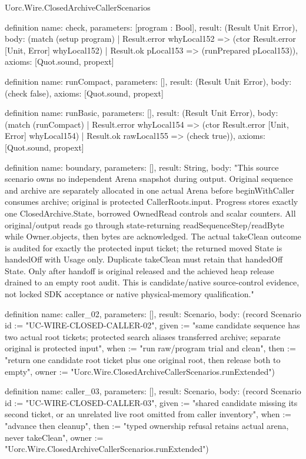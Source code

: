 \begin{lexlean}{Uorc.Wire.ClosedArchiveCallerScenarios}
\begin{semanticmodule}
definition{
  name: check,
  parameters: [program : Bool],
  result: (Result Unit Error),
  body: (match (setup program)
    | Result.error whyLocal152 => (ctor Result.error [Unit, Error] whyLocal152)
    | Result.ok pLocal153 => (runPrepared pLocal153)),
  axioms: [Quot.sound, propext]
}

definition{
  name: runCompact,
  parameters: [],
  result: (Result Unit Error),
  body: (check false),
  axioms: [Quot.sound, propext]
}

definition{
  name: runBasic,
  parameters: [],
  result: (Result Unit Error),
  body: (match (runCompact)
    | Result.error whyLocal154 => (ctor Result.error [Unit, Error] whyLocal154)
    | Result.ok rawLocal155 => (check true)),
  axioms: [Quot.sound, propext]
}

definition{
  name: boundary,
  parameters: [],
  result: String,
  body: "This source scenario owns no independent Arena snapshot during output. Original sequence and archive are separately allocated in one actual Arena before beginWithCaller consumes archive; original is protected CallerRoots.input. Progress stores exactly one ClosedArchive.State, borrowed OwnedRead controls and scalar counters. All original/output reads go through state-returning readSequenceStep/readByte while Owner.objects, then bytes are acknowledged. The actual takeClean outcome is audited for exactly the protected input ticket; the returned moved State is handedOff with Usage only. Duplicate takeClean must retain that handedOff State. Only after handoff is original released and the achieved heap release drained to an empty root audit. This is candidate/native source-control evidence, not locked SDK acceptance or native physical-memory qualification."
}

definition{
  name: caller_02,
  parameters: [],
  result: Scenario,
  body: (record Scenario {id := "UC-WIRE-CLOSED-CALLER-02", given := "same candidate sequence has two actual root tickets; protected search aliases transferred archive; separate original is protected input", when := "run raw/program trial and clean", then := "return one candidate root ticket plus one original root, then release both to empty", owner := "Uorc.Wire.ClosedArchiveCallerScenarios.runExtended"})
}

definition{
  name: caller_03,
  parameters: [],
  result: Scenario,
  body: (record Scenario {id := "UC-WIRE-CLOSED-CALLER-03", given := "shared candidate missing its second ticket, or an unrelated live root omitted from caller inventory", when := "advance then cleanup", then := "typed ownership refusal retains actual arena, never takeClean", owner := "Uorc.Wire.ClosedArchiveCallerScenarios.runExtended"})
}


\end{semanticmodule}
\end{lexlean}
